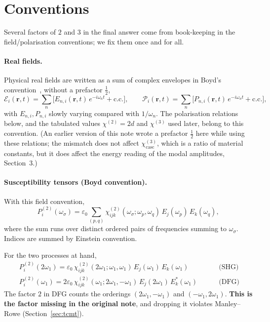\documentclass[11pt,a4paper]{article}
\newcommand{\eps}{\varepsilon}
\newcommand{\bvec}[1]{\mathbf{#1}}
\newcommand{\ri}{\bvec{r}}
\newcommand{\chitwo}{\chi^{(2)}}
\newcommand{\chithree}{\chi^{(3)}}
\begin{document}
\section{Conventions}\label{sec:conventions}

Several factors of $2$ and $3$ in the final answer come from book-keeping
in the field/polarisation conventions; we fix them once and for all.

\paragraph{Real fields.}
Physical real fields are written as a sum of complex envelopes in
Boyd's convention~\cite{Boyd}, without a prefactor $\tfrac12$,
\begin{equation}
  \mathcal{E}_i(\ri,t)=\sum_n\!\bigl[E_{n,i}(\ri,t)\,e^{-i\omega_n t}+\mathrm{c.c.}\bigr],\qquad
  \mathcal{P}_i(\ri,t)=\sum_n\!\bigl[P_{n,i}(\ri,t)\,e^{-i\omega_n t}+\mathrm{c.c.}\bigr],
\end{equation}
with $E_{n,i},P_{n,i}$ slowly varying compared with $1/\omega_n$.  The
polarisation relations below, and the tabulated values
$\chitwo=2d$ and $\chithree$ used later, belong to this convention.
(An earlier version of this note wrote a prefactor $\tfrac12$ here while
using these relations; the mismatch does not affect $\chithree_\text{casc}$,
which is a ratio of material constants, but it does affect the energy
reading of the modal amplitudes, Section~3.)

\paragraph{Susceptibility tensors (Boyd convention).}
With this field convention,
\begin{equation}
  P_i^{(2)}(\omega_\sigma)=\eps_0\!\!\sum_{(p,q)}\!\chitwo_{ijk}(\omega_\sigma;\omega_p,\omega_q)\,E_j(\omega_p)\,E_k(\omega_q),
\end{equation}
where the sum runs over distinct ordered pairs of frequencies summing to
$\omega_\sigma$.  Indices are summed by Einstein convention.

For the two processes at hand,
\begin{align}
  \boxed{\;P_i^{(2)}(2\omega_1)=\eps_0\,\chitwo_{ijk}(2\omega_1;\omega_1,\omega_1)\,E_j(\omega_1)\,E_k(\omega_1)\;}
  &\qquad\text{(SHG)} \label{eq:PSHG}\\[4pt]
  \boxed{\;P_i^{(2)}(\omega_1)=2\eps_0\,\chitwo_{ijk}(\omega_1;2\omega_1,-\omega_1)\,E_j(2\omega_1)\,E_k^*(\omega_1)\;}
  &\qquad\text{(DFG)}\label{eq:PDFG}
\end{align}
The factor $2$ in DFG counts the orderings $(2\omega_1,-\omega_1)$ and
$(-\omega_1,2\omega_1)$.  \textbf{This is the factor missing in the
original note}, and dropping it violates Manley--Rowe (Section~\ref{sec:tcmt}).
\end{document}
